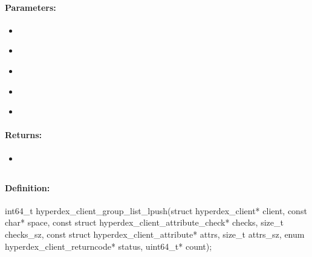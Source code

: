 \paragraph{Parameters:}
\begin{itemize}[noitemsep]
\item {}\\

\item {}\\

\item {}\\

\item {}\\

\item {}\\

\end{itemize}

\paragraph{Returns:}
\begin{itemize}[noitemsep]
\item {}\\

\end{itemize}

\pagebreak
\subsection{}
\label{api:c:group_list_lpush}


\paragraph{Definition:}
\begin{ccode}
int64_t hyperdex_client_group_list_lpush(struct hyperdex_client* client,
        const char* space,
        const struct hyperdex_client_attribute_check* checks, size_t checks_sz,
        const struct hyperdex_client_attribute* attrs, size_t attrs_sz,
        enum hyperdex_client_returncode* status,
        uint64_t* count);
\end{ccode}


